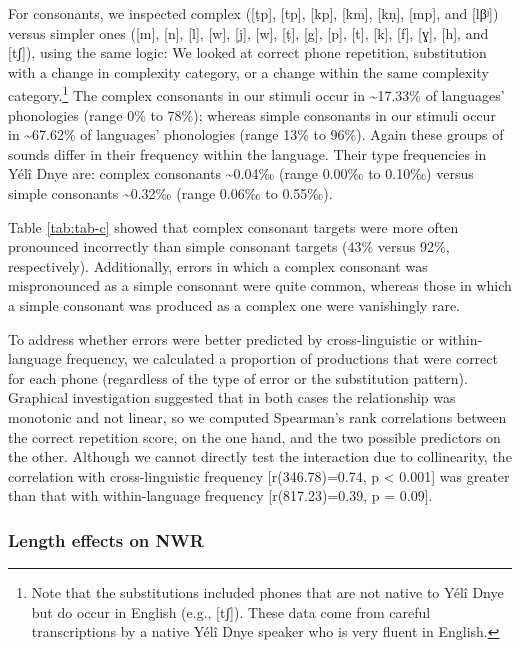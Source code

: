 \documentclass[
  american,
  ,man,floatsintext]{apa6}
\begin{document}
For consonants, we inspected complex ({[}ṭp{]}, {[}tp{]}, {[}kp{]}, {[}km{]}, {[}kṇ{]}, {[}mp{]}, and {[}lβʲ{]}) versus simpler ones ({[}m{]}, {[}n{]}, {[}l{]}, {[}w{]}, {[}j{]}, {[}w{]}, {[}ṭ{]}, {[}g{]}, {[}p{]}, {[}t{]}, {[}k{]}, {[}f{]}, {[}ɣ{]}, {[}h{]}, and {[}tʃ{]}), using the same logic: We looked at correct phone repetition, substitution with a change in complexity category, or a change within the same complexity category.\footnote{Note that the substitutions included phones that are not native to Yélî Dnye but do occur in English (e.g., {[}tʃ{]}). These data come from careful transcriptions by a native Yélî Dnye speaker who is very fluent in English.}
The complex consonants in our stimuli occur in \textasciitilde17.33\% of languages' phonologies (range 0\% to 78\%);
whereas simple consonants in our stimuli occur in \textasciitilde67.62\% of languages' phonologies (range 13\% to 96\%).
Again these groups of sounds differ in their frequency within the language. Their type frequencies in Yélî Dnye are: complex consonants \textasciitilde0.04‰ (range 0.00‰ to 0.10‰) versus simple consonants \textasciitilde0.32‰ (range 0.06‰ to 0.55‰).

Table \ref{tab:tab-c} showed that complex consonant targets were more often pronounced incorrectly than simple consonant targets (43\% versus 92\%, respectively). Additionally, errors in which a complex consonant was mispronounced as a simple consonant were quite common, whereas those in which a simple consonant was produced as a complex one were vanishingly rare.

To address whether errors were better predicted by cross-linguistic or within-language frequency, we calculated a proportion of productions that were correct for each phone (regardless of the type of error or the substitution pattern). Graphical investigation suggested that in both cases the relationship was monotonic and not linear, so we computed Spearman's rank correlations between the correct repetition score, on the one hand, and the two possible predictors on the other. Although we cannot directly test the interaction due to collinearity, the correlation with cross-linguistic frequency {[}r(346.78)=0.74, p \textless{} 0.001{]} was greater than that with within-language frequency {[}r(817.23)=0.39, p = 0.09{]}.

\hypertarget{length-effects-on-nwr-1}{%
\subsubsection{Length effects on NWR}\label{length-effects-on-nwr-1}}
\end{document}
